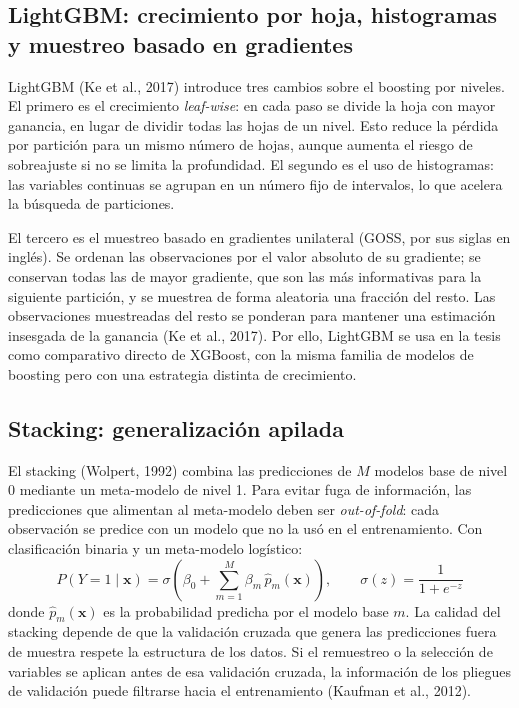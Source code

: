 \subsection{LightGBM: crecimiento por hoja, histogramas y muestreo basado en gradientes}
LightGBM (Ke et al., 2017) introduce tres cambios sobre el boosting por niveles. El primero es el crecimiento \textit{leaf-wise}: en cada paso se divide la hoja con mayor ganancia, en lugar de dividir todas las hojas de un nivel. Esto reduce la pérdida por partición para un mismo número de hojas, aunque aumenta el riesgo de sobreajuste si no se limita la profundidad. El segundo es el uso de histogramas: las variables continuas se agrupan en un número fijo de intervalos, lo que acelera la búsqueda de particiones.%

El tercero es el muestreo basado en gradientes unilateral (GOSS, por sus siglas en inglés). Se ordenan las observaciones por el valor absoluto de su gradiente; se conservan todas las de mayor gradiente, que son las más informativas para la siguiente partición, y se muestrea de forma aleatoria una fracción del resto. Las observaciones muestreadas del resto se ponderan para mantener una estimación insesgada de la ganancia (Ke et al., 2017). Por ello, LightGBM se usa en la tesis como comparativo directo de XGBoost, con la misma familia de modelos de boosting pero con una estrategia distinta de crecimiento.

\subsection{Stacking: generalización apilada}
El stacking (Wolpert, 1992) combina las predicciones de $M$ modelos base de nivel 0 mediante un meta-modelo de nivel 1. Para evitar fuga de información, las predicciones que alimentan al meta-modelo deben ser \textit{out-of-fold}: cada observación se predice con un modelo que no la usó en el entrenamiento. Con clasificación binaria y un meta-modelo logístico:
\begin{equation}
P(Y=1\mid\mathbf{x}) = \sigma\left(\beta_0 + \sum_{m=1}^M \beta_m\, \hat{p}_m(\mathbf{x})\right), \qquad \sigma(z)=\frac{1}{1+e^{-z}}
\label{eq:stacking}
\end{equation}
donde $\hat{p}_m(\mathbf{x})$ es la probabilidad predicha por el modelo base $m$. La calidad del stacking depende de que la validación cruzada que genera las predicciones fuera de muestra respete la estructura de los datos. Si el remuestreo o la selección de variables se aplican antes de esa validación cruzada, la información de los pliegues de validación puede filtrarse hacia el entrenamiento (Kaufman et al., 2012).

